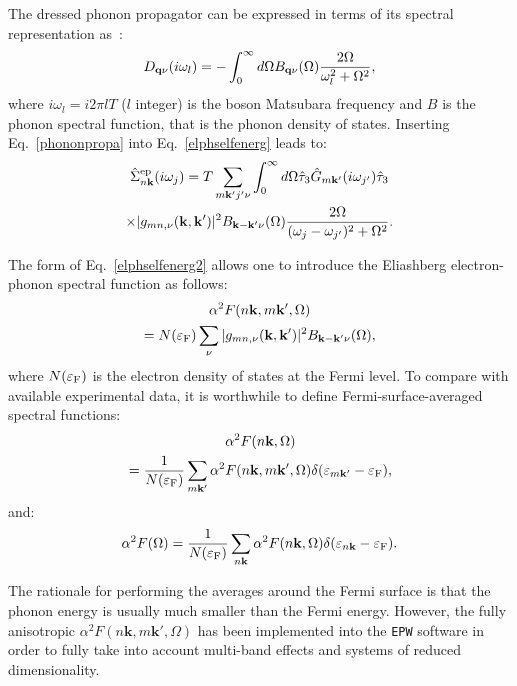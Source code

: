 \documentclass[final,3p,times,twocolumn]{elsarticle}
\begin{document}
The dressed phonon propagator can be expressed in terms of its spectral representation as~\cite{Allen1983a,Marsiglio2008}: 
\begin{equation}\label{phononpropa}
D_{\bf{q}\nu}(i\omega_l) =-\int_0^{\infty} d \Omega B_{\bf{q}\nu}(\Omega)\frac{2\Omega}{\omega_l^2+\Omega^2},
\end{equation}
where $i\omega_l=i 2\pi  l T$ ($l$ integer) is the boson Matsubara frequency and $B$ is the phonon spectral function, that is the phonon density of states. 
Inserting Eq.~\eqref{phononpropa} into Eq.~\eqref{elphselfenerg} leads to: 
\begin{multline}\label{elphselfenerg2}
\hat{\Sigma}_{n\mathbf{k}}^{\text{ep}}(i\omega_j) = T \sum_{m\mathbf{k'}j'\nu}\int_0^{\infty} d \Omega \hat{\tau}_3 \hat{G}_{m\bf{k'}}(i\omega_{j'})\hat{\tau}_3 \\
\times |g_{mn,\nu}(\mathbf{k,k'})|^2  B_{\bf{k-k'}\nu}(\Omega)\frac{2\Omega}{(\omega_j-\omega_{j'})^2+\Omega^2}.
\end{multline}

The form of Eq.~\eqref{elphselfenerg2} allows one to introduce the Eliashberg electron-phonon spectral function as follows:
\begin{multline}\label{Elishberga2F}
\alpha^2 F(n\mathbf{k},m \mathbf{k'},\Omega) \\
= N(\varepsilon_{\rm F}) \sum_\nu |g_{mn,\nu}(\mathbf{k,k'})|^2 B_{\bf{k-k'}\nu}(\Omega),
\end{multline}
where $N(\varepsilon_{\rm F})$ is the electron density of states at the Fermi level.
To compare with available experimental data, it is worthwhile to define Fermi-surface-averaged spectral functions:
\begin{multline}
\alpha^2 F(n\mathbf{k},\Omega) \\
= \frac{1}{N(\varepsilon_{\rm F})} \sum_{m\bf{k'}} \alpha^2 F(n\mathbf{k},m \mathbf{k'},\Omega) \delta(\varepsilon_{m\bf{k'}}-\varepsilon_{\rm F}),
\end{multline}
and:
\begin{equation}
\alpha^2 F(\Omega) = \frac{1}{N(\varepsilon_{\rm F})} \sum_{n\bf{k}} \alpha^2 F(n\mathbf{k},\Omega) \delta(\varepsilon_{n\bf{k}}-\varepsilon_{\rm F}).
\end{equation}

The rationale for performing the averages around the Fermi surface is that the phonon energy is usually much smaller than the Fermi energy. However,
the fully anisotropic $\alpha^2 F(n\mathbf{k},m \mathbf{k'},\Omega)$ has been implemented into the \texttt{EPW} software in order to fully take into account multi-band effects and systems of reduced dimensionality.
\end{document}
